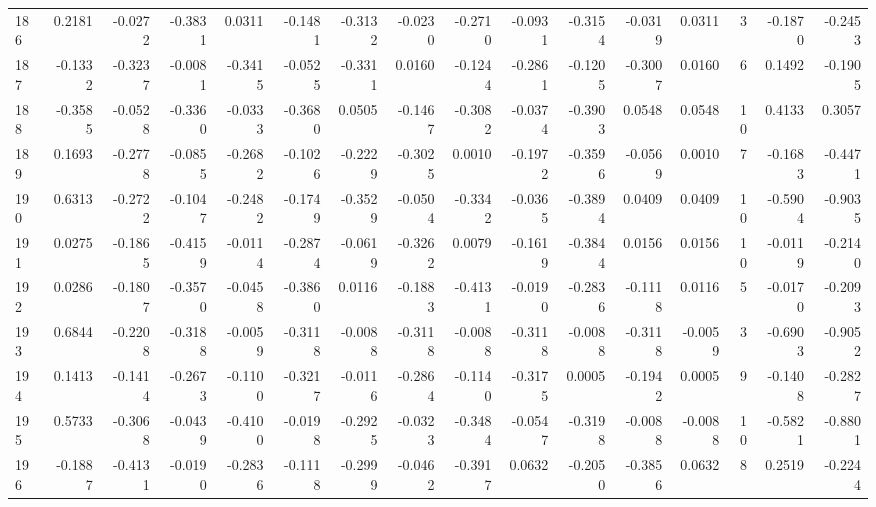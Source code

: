 \begin{tabular}{lrrrrrrrrrrrrrrr}
186 &      0.2181 & -0.0272 & -0.3831 &  0.0311 & -0.1481 & -0.3132 & -0.0230 & -0.2710 & -0.0931 & -0.3154 &  -0.0319 &     0.0311 &      3 &                   -0.1870 &                    -0.2453 \\
187 &     -0.1332 & -0.3237 & -0.0081 & -0.3415 & -0.0525 & -0.3311 &  0.0160 & -0.1244 & -0.2861 & -0.1205 &  -0.3007 &     0.0160 &      6 &                    0.1492 &                    -0.1905 \\
188 &     -0.3585 & -0.0528 & -0.3360 & -0.0333 & -0.3680 &  0.0505 & -0.1467 & -0.3082 & -0.0374 & -0.3903 &   0.0548 &     0.0548 &     10 &                    0.4133 &                     0.3057 \\
189 &      0.1693 & -0.2778 & -0.0855 & -0.2682 & -0.1026 & -0.2229 & -0.3025 &  0.0010 & -0.1972 & -0.3596 &  -0.0569 &     0.0010 &      7 &                   -0.1683 &                    -0.4471 \\
190 &      0.6313 & -0.2722 & -0.1047 & -0.2482 & -0.1749 & -0.3529 & -0.0504 & -0.3342 & -0.0365 & -0.3894 &   0.0409 &     0.0409 &     10 &                   -0.5904 &                    -0.9035 \\
191 &      0.0275 & -0.1865 & -0.4159 & -0.0114 & -0.2874 & -0.0619 & -0.3262 &  0.0079 & -0.1619 & -0.3844 &   0.0156 &     0.0156 &     10 &                   -0.0119 &                    -0.2140 \\
192 &      0.0286 & -0.1807 & -0.3570 & -0.0458 & -0.3860 &  0.0116 & -0.1883 & -0.4131 & -0.0190 & -0.2836 &  -0.1118 &     0.0116 &      5 &                   -0.0170 &                    -0.2093 \\
193 &      0.6844 & -0.2208 & -0.3188 & -0.0059 & -0.3118 & -0.0088 & -0.3118 & -0.0088 & -0.3118 & -0.0088 &  -0.3118 &    -0.0059 &      3 &                   -0.6903 &                    -0.9052 \\
194 &      0.1413 & -0.1414 & -0.2673 & -0.1100 & -0.3217 & -0.0116 & -0.2864 & -0.1140 & -0.3175 &  0.0005 &  -0.1942 &     0.0005 &      9 &                   -0.1408 &                    -0.2827 \\
195 &      0.5733 & -0.3068 & -0.0439 & -0.4100 & -0.0198 & -0.2925 & -0.0323 & -0.3484 & -0.0547 & -0.3198 &  -0.0088 &    -0.0088 &     10 &                   -0.5821 &                    -0.8801 \\
196 &     -0.1887 & -0.4131 & -0.0190 & -0.2836 & -0.1118 & -0.2999 & -0.0462 & -0.3917 &  0.0632 & -0.2050 &  -0.3856 &     0.0632 &      8 &                    0.2519 &                    -0.2244 \\

\end{tabular}
